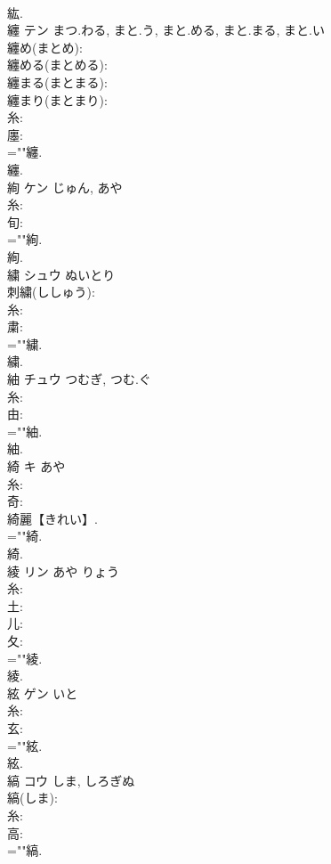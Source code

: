\documentclass[8pt]{extreport}
\begin{document}
\begin{CJK}{UTF8}{min}
\\	紘.
\\	纏	テン	まつ.わる, まと.う, まと.める, まと.まる, まと.い		
\\	纏め(まとめ): 
\\	纏める(まとめる): 
\\	纏まる(まとまる): 
\\	纏まり(まとまり): 
\\	糸: 
\\	廛: 
\\	=""纏.
\\	纏.
\\	絢	ケン		じゅん, あや	
\\	糸: 
\\	旬: 
\\	=""絢.
\\	絢.
\\	繍	シュウ	ぬいとり		
\\	刺繍(ししゅう): 
\\	糸: 
\\	粛: 
\\	=""繍.
\\	繍.
\\	紬	チュウ	つむぎ, つむ.ぐ		
\\	糸: 
\\	由: 
\\	=""紬.
\\	紬.
\\	綺	キ	あや		
\\	糸: 
\\	奇: 
\\	綺麗【きれい】.
\\	=""綺.
\\	綺.
\\	綾	リン	あや	りょう	
\\	糸: 
\\	土: 
\\	儿: 
\\	夂: 
\\	=""綾.
\\	綾.
\\	絃	ゲン	いと		
\\	糸: 
\\	玄: 
\\	=""絃.
\\	絃.
\\	縞	コウ	しま, しろぎぬ		
\\	縞(しま): 
\\	糸: 
\\	高: 
\\	=""縞.

\end{CJK}
\end{document}
